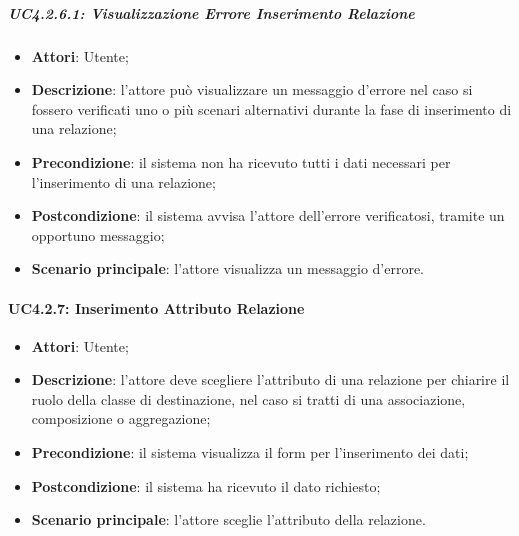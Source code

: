 \subparagraph{UC4.2.6.1: Visualizzazione Errore Inserimento Relazione}
\label{UC4.2.6.1}
\begin{itemize}
	\item \textbf{Attori}: Utente;
	\item \textbf{Descrizione}: l'attore può visualizzare un messaggio d'errore nel caso si fossero verificati uno o più scenari alternativi durante la fase di inserimento di una relazione;
	\item \textbf{Precondizione}: il sistema non ha ricevuto tutti i dati necessari per l'inserimento di una relazione;
	\item \textbf{Postcondizione}: il sistema avvisa l'attore dell'errore verificatosi, tramite un opportuno messaggio;
	\item \textbf{Scenario principale}: l'attore visualizza un messaggio d'errore.
\end{itemize}


\paragraph{UC4.2.7: Inserimento Attributo Relazione}
\label{UC4.2.7}
\begin{itemize}
	\item \textbf{Attori}: Utente;
	\item \textbf{Descrizione}: l'attore deve scegliere l'attributo di una relazione per chiarire il ruolo della classe di destinazione, nel caso si tratti di una associazione, composizione o aggregazione;
	\item \textbf{Precondizione}: il sistema visualizza il form per l'inserimento dei dati;
	\item \textbf{Postcondizione}: il sistema ha ricevuto il dato richiesto;
	\item \textbf{Scenario principale}: l'attore sceglie l'attributo della relazione.
\end{itemize}

